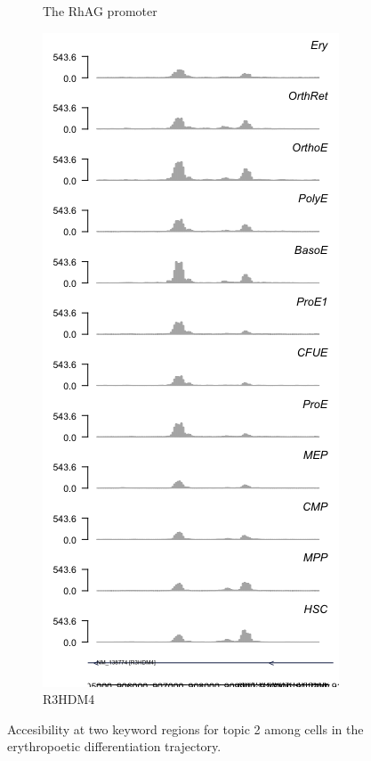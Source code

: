\begin{figure}
\begin{subfigure}[b]{0.5\linewidth}
      \caption{The RhAG promoter}
      \label{fig:RhAG}
  \end{subfigure}
  \hfill
  \begin{subfigure}[b]{0.5\linewidth}
    \centering
    \includegraphics[width=\textwidth]{plot/ch4/R3HDM4}
    \caption{R3HDM4}
    \label{fig:r3hdm4}
  \end{subfigure}

  \caption{Accesibility at two keyword regions for topic 2 among cells in the erythropoetic differentiation trajectory. }
    
\end{figure}

